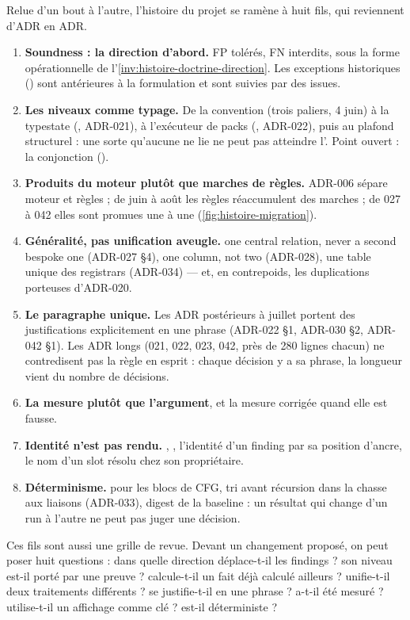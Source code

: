 Relue d'un bout à l'autre, l'histoire du projet se ramène à huit fils, qui reviennent d'ADR en ADR.

\begin{enumerate}
  \item \textbf{Soundness : la direction d'abord.} FP tolérés, FN interdits, sous la forme opérationnelle de l'\cref{inv:histoire-doctrine-direction}. Les exceptions historiques () sont antérieures à la formulation et sont suivies par des issues.
  \item \textbf{Les niveaux comme typage.} De la convention (trois paliers, 4 juin) à la typestate (, ADR-021), à l'exécuteur de packs (, ADR-022), puis au plafond structurel : une sorte qu'aucune  ne lie ne peut pas atteindre l'\Error{}. Point ouvert : la conjonction ().
  \item \textbf{Produits du moteur plutôt que marches de règles.} ADR-006 sépare moteur et règles ; de juin à août les règles réaccumulent des marches ; de 027 à 042 elles sont promues une à une (\cref{fig:histoire-migration}).
  \item \textbf{Généralité, pas unification aveugle.} \og one central relation, never a second bespoke one\fg{} (ADR-027 §4), \og one column, not two\fg{} (ADR-028), une table unique des registrars (ADR-034) --- et, en contrepoids, les duplications porteuses d'ADR-020.
  \item \textbf{Le paragraphe unique.} Les ADR postérieurs à juillet portent des justifications explicitement \og en une phrase\fg{} (ADR-022 §1, ADR-030 §2, ADR-042 §1). Les ADR longs (021, 022, 023, 042, près de 280 lignes chacun) ne contredisent pas la règle en esprit : chaque décision y a sa phrase, la longueur vient du nombre de décisions.
  \item \textbf{La mesure plutôt que l'argument}, et la mesure corrigée quand elle est fausse.
  \item \textbf{Identité n'est pas rendu.} , , l'identité d'un finding par sa position d'ancre, le nom d'un slot résolu chez son propriétaire.
  \item \textbf{Déterminisme.}  pour les blocs de CFG, tri avant récursion dans la chasse aux liaisons (ADR-033), digest de la baseline : un résultat qui change d'un run à l'autre ne peut pas juger une décision.
\end{enumerate}

\begin{remarque}
Ces fils sont aussi une grille de revue. Devant un changement proposé, on peut poser huit questions : dans quelle direction déplace-t-il les findings ? son niveau est-il porté par une preuve ? calcule-t-il un fait déjà calculé ailleurs ? unifie-t-il deux traitements différents ? se justifie-t-il en une phrase ? a-t-il été mesuré ? utilise-t-il un affichage comme clé ? est-il déterministe ?
\end{remarque}

